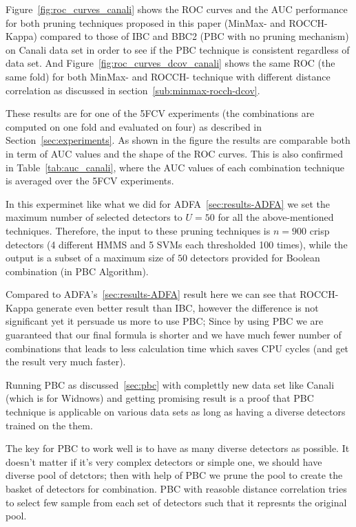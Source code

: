 Figure~\ref{fig:roc_curves_canali} shows the ROC curves and the AUC performance for both pruning techniques proposed in this paper (MinMax- and ROCCH-Kappa) compared to those of IBC and BBC2 (PBC with no pruning mechanism) on Canali data set in order to see if the PBC technique is consistent regardless of data set. And Figure~\ref{fig:roc_curves_dcov_canali} shows the same ROC (the same fold) for both MinMax- and ROCCH- technique with different distance correlation as discussed in section~\ref{sub:minmax-rocch-dcov}.

These results are for one of the 5FCV experiments (the combinations are computed on one fold and evaluated on four) as described in Section~\ref{sec:experiments}.
As shown in the figure the results are comparable both in term of AUC values and the shape of the ROC curves.
This is also confirmed in Table~\ref{tab:auc_canali}, where the AUC values of each combination technique is averaged over the 5FCV experiments.

In this experminet like what we did for ADFA~\ref{sec:results-ADFA} we set the maximum number of selected detectors to $U=50$ for all the above-mentioned techniques.
Therefore, the input to these pruning techniques is $n=900$ crisp detectors (4 different HMMS and 5 SVMs each thresholded 100 times), while the output is a subset of a maximum size of $50$ detectors provided for Boolean combination (in PBC Algorithm).

Compared to ADFA's~\ref{sec:results-ADFA} result here we can see that ROCCH-Kappa generate even better result than IBC, however the difference is not significant yet it persuade us more to use PBC; Since by using PBC we are guaranteed that our final formula is shorter and we have much fewer number of combinations that leads to less calculation time which saves CPU cycles (and get the result very much faster).

Running PBC as discussed~\ref{sec:pbc} with complettly new data set like Canali (which is for Widnows) and getting promising result is a proof that PBC technique is applicable on various data sets as long as having a diverse detectors trained on the them.

The key for PBC to work well is to have as many diverse detectors as possible. It doesn't matter if it's very complex detectors or simple one, we should have diverse pool of detctors; then with help of PBC we prune the pool to create the basket of detectors for combination. PBC with reasoble distance correlation tries to  select few sample from each set of detectors such that it represnts the original pool.

